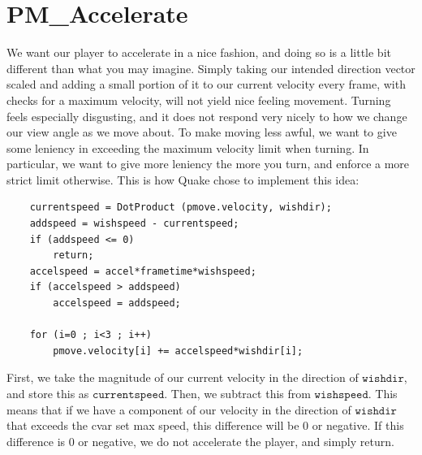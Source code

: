 \documentclass{article}
\begin{document}
\section{PM\_Accelerate}
We want our player to accelerate in a nice fashion, and doing so is a little bit different than what you may imagine. Simply taking our intended direction vector scaled and adding a small portion of it to our current velocity every frame, with checks for a maximum velocity, will not yield nice feeling movement. Turning feels especially disgusting, and it does not respond very nicely to how we change our view angle as we move about. To make moving less awful, we want to give some leniency in exceeding the maximum velocity limit when turning. In particular, we want to give more leniency the more you turn, and enforce a more strict limit otherwise. This is how Quake chose to implement this idea:
\begin{verbatim}
	currentspeed = DotProduct (pmove.velocity, wishdir);
	addspeed = wishspeed - currentspeed;
	if (addspeed <= 0)
		return;
	accelspeed = accel*frametime*wishspeed;
	if (accelspeed > addspeed)
		accelspeed = addspeed;
	
	for (i=0 ; i<3 ; i++)
		pmove.velocity[i] += accelspeed*wishdir[i];	
\end{verbatim}
First, we take the magnitude of our current velocity in the direction of $\texttt{wishdir}$, and store this as $\texttt{currentspeed}$. Then, we subtract this from $\texttt{wishspeed}$. This means that if we have a component of our velocity in the direction of $\texttt{wishdir}$ that exceeds the cvar set max speed, this difference will be 0 or negative. If this difference is 0 or negative, we do not accelerate the player, and simply return. \\
\end{document}
